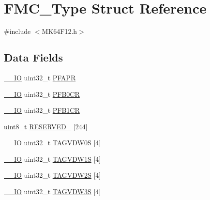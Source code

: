 \hypertarget{struct_f_m_c___type}{}\section{F\+M\+C\+\_\+\+Type Struct Reference}
\label{struct_f_m_c___type}


{\ttfamily \#include $<$M\+K64\+F12.\+h$>$}

\subsection*{Data Fields}
\begin{DoxyCompactItemize}
\item 
\mbox{\hyperlink{core__cm4_8h_aec43007d9998a0a0e01faede4133d6be}{\+\_\+\+\_\+\+IO}} uint32\+\_\+t \mbox{\hyperlink{group___v_r_e_f___peripheral___access___layer_ga78f7ac1c9cc55542d3350387c83c5f37}{P\+F\+A\+PR}}
\item 
\mbox{\hyperlink{core__cm4_8h_aec43007d9998a0a0e01faede4133d6be}{\+\_\+\+\_\+\+IO}} uint32\+\_\+t \mbox{\hyperlink{group___v_r_e_f___peripheral___access___layer_ga49876565828348d94752e398239ca0b3}{P\+F\+B0\+CR}}
\item 
\mbox{\hyperlink{core__cm4_8h_aec43007d9998a0a0e01faede4133d6be}{\+\_\+\+\_\+\+IO}} uint32\+\_\+t \mbox{\hyperlink{group___v_r_e_f___peripheral___access___layer_ga71e702d9f9449e9be78f586aa1f86974}{P\+F\+B1\+CR}}
\item 
uint8\+\_\+t \mbox{\hyperlink{group___v_r_e_f___peripheral___access___layer_gaf4371fac6e68ff762b0c76c55ade6b91}{R\+E\+S\+E\+R\+V\+E\+D\+\_}} \mbox{[}244\mbox{]}
\item 
\mbox{\hyperlink{core__cm4_8h_aec43007d9998a0a0e01faede4133d6be}{\+\_\+\+\_\+\+IO}} uint32\+\_\+t \mbox{\hyperlink{group___v_r_e_f___peripheral___access___layer_gafbef7be4132f76a31f1a0e0311c2fc92}{T\+A\+G\+V\+D\+W0S}} \mbox{[}4\mbox{]}
\item 
\mbox{\hyperlink{core__cm4_8h_aec43007d9998a0a0e01faede4133d6be}{\+\_\+\+\_\+\+IO}} uint32\+\_\+t \mbox{\hyperlink{group___v_r_e_f___peripheral___access___layer_ga283e3e05f6df99bb519c742e82b9780d}{T\+A\+G\+V\+D\+W1S}} \mbox{[}4\mbox{]}
\item 
\mbox{\hyperlink{core__cm4_8h_aec43007d9998a0a0e01faede4133d6be}{\+\_\+\+\_\+\+IO}} uint32\+\_\+t \mbox{\hyperlink{group___v_r_e_f___peripheral___access___layer_gac6ab468a5fa5f4676e320650f42acb51}{T\+A\+G\+V\+D\+W2S}} \mbox{[}4\mbox{]}
\item 
\mbox{\hyperlink{core__cm4_8h_aec43007d9998a0a0e01faede4133d6be}{\+\_\+\+\_\+\+IO}} uint32\+\_\+t \mbox{\hyperlink{group___v_r_e_f___peripheral___access___layer_ga35dd309b49b2d2e1092a1ada9beece08}{T\+A\+G\+V\+D\+W3S}} \mbox{[}4\mbox{]}

\end{DoxyCompactItemize}
